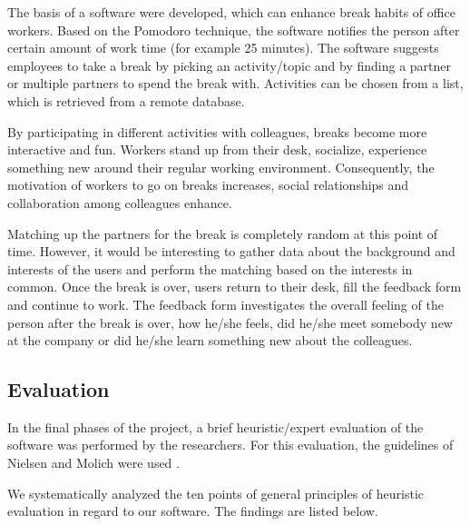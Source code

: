The basis of a software were developed, which can enhance break habits of office workers. Based on the Pomodoro technique, the software notifies the person after certain amount of work time (for example 25 minutes). The software suggests employees to take a break by picking an activity/topic and by finding a partner or multiple partners to spend the break with. Activities can be chosen from a list, which is retrieved from a remote database. 

By participating in different activities with colleagues, breaks become more interactive and fun. Workers stand up from their desk, socialize, experience something new around their regular working environment. Consequently, the motivation of workers to go on breaks increases, social relationships and collaboration among colleagues enhance. 

Matching up the partners for the break is completely random at this point of time. However, it would be interesting to gather data about the background and interests of the users and perform the matching based on the interests in common. Once the break is over, users return to their desk, fill the feedback form and continue to work. The feedback form investigates the overall feeling of the person after the break is over, how he/she feels, did he/she meet somebody new at the company or did he/she learn something new about the colleagues. 

\subsection{Evaluation}
In the final phases of the project, a brief heuristic/expert evaluation of the software was performed by the researchers. For this evaluation, the guidelines of Nielsen and Molich were used \cite{nielsen} \cite{nielsenonline}. 

We systematically analyzed the ten points of general principles of heuristic evaluation in regard to our software. The findings are listed below. 

